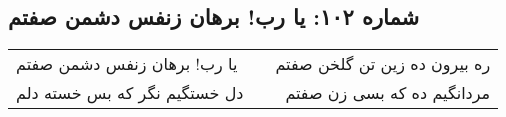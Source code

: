 \begin{center}
\section*{شماره ۱۰۲: یا رب! برهان زنفس دشمن صفتم}
\label{sec:102}
\begin{longtable}{l p{0.5cm} r}
یا رب! برهان زنفس دشمن صفتم
&&
ره بیرون ده زین تن گلخن صفتم
\\
دل خستگیم نگر که بس خسته دلم
&&
مردانگیم ده که بسی زن صفتم
\\
\end{longtable}
\end{center}
